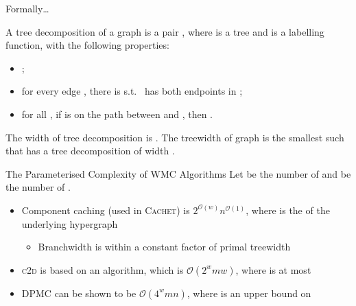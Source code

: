 \documentclass{beamer}
\begin{document}
\begin{frame}{Formally\dots}
\begin{definition}\label{def:treewidth}
  A \alert{tree decomposition} of a graph  is a pair
  , where  is a tree and
   is a labelling
  function, with the following properties:
  \begin{itemize}
    \item {};
    \item for every edge , there is
           s.t.\  has both
          endpoints in ;
    \item for all , if
           is on the path between  and
          , then
          .
  \end{itemize}
  The \alert{width} of tree decomposition  is
  . The \alert{treewidth}
  of graph  is the smallest  such that
   has a tree decomposition of width .
\end{definition}
\end{frame}

\begin{frame}{The Parameterised Complexity of WMC Algorithms}
  Let  be the number of  and  be
  the number of .
  \begin{itemize}
    \item Component caching (used in \textsc{Cachet}) is
          \alert{$2^{\mathcal{O}(w)}n^{\mathcal{O}(1)}$}, where 
          is the  of the underlying hypergraph
          \textcolor{gray}{\parencite{DBLP:journals/jair/BacchusDP09}}
          \begin{itemize}
            \item Branchwidth is within a constant factor of primal treewidth
          \end{itemize}
    \item \textsc{c2d} is based on an algorithm, which is
          \alert{$\mathcal{O}(2^{w}mw)$}, where  is at most
          \textcolor{gray}{\parencite{DBLP:journals/jacm/Darwiche01,DBLP:conf/ecai/Darwiche04}}
    \item \textsc{DPMC} can be shown to be \alert{$\mathcal{O}(4^{w}mn)$}, where
           is an upper bound on 
  \end{itemize}
\end{frame}
\end{document}
